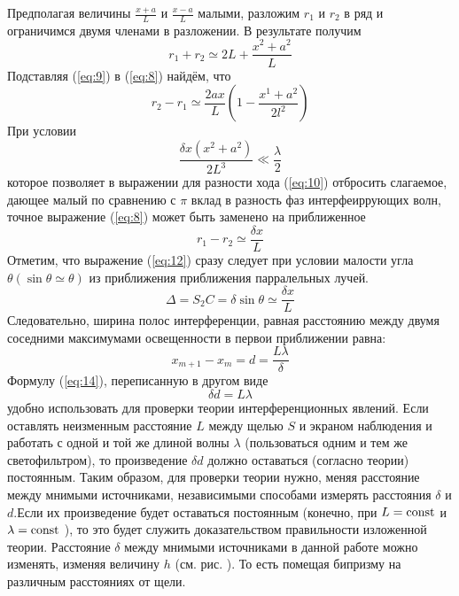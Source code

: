 Предполагая величины $\frac{x+a}{L}$ и $\frac{x-a}{L}$ малыми, разложим $r_1$ и $r_2$ в ряд и ограничимся двумя членами в разложении. В результате получим
\begin{equation}
	\label{eq:9}
	r_1+r_2\simeq 2L +\frac{x^2+a^2}{L} 
\end{equation}
Подставляя (\ref{eq:9}) в (\ref{eq:8}) найдём, что 
\begin{equation}
	r_2-r_1\simeq \frac{2ax}{L}\left(1-\frac{x^1+a^2}{2l^2} \right) \label{eq:10}
\end{equation}
При условии 
\begin{equation}
	\frac{\delta x(x^2+a^2)}{2L^3}\ll\frac{\lambda}{2}
\end{equation}
которое позволяет в выражении для разности хода (\ref{eq:10}) отбросить слагаемое, дающее малый по сравнению с $\pi$ вклад в разность фаз интерфеиррующих волн, точное выражение (\ref{eq:8}) может быть заменено на приближенное
\begin{equation}
 	r_1-r_2\simeq\frac{\delta x}{L} \label{eq:12}
 \end{equation} 
 Отметим, что выражение (\ref{eq:12}) сразу следует при условии малости угла 
 $\theta (\sin{\theta}\simeq\theta)$ из приближения приближения парралельных лучей. 
 \begin{equation}
 	\Delta=S_2C=\delta\sin{\theta}\simeq\frac{\delta x}{L}
 \end{equation}
 Следовательно, ширина полос интерференции, равная расстоянию между двумя соседними максимумами освещенности в первои приближении равна:
 \begin{equation}
 	x_{m+1}-x_m=d=\frac{L\lambda}{\delta} \label{eq:14}
 \end{equation}
 Формулу (\ref{eq:14}), переписанную в другом виде
 \begin{equation}
 	\delta d=L\lambda
 \end{equation}
 удобно использовать для проверки теории интерференционных явлений. Если оставлять неизменным расстояние $L$ между щелью $S$ и экраном наблюдения и работать с одной и той же длиной волны $\lambda$ (пользоваться одним и тем же светофильтром), то произведение $\delta d$ должно оставаться (согласно теории) постоянным. Таким образом, для проверки теории нужно, меняя расстояние между мнимыми источниками, независимыми способами измерять расстояния $\delta$ и $d$.Если их произведение будет оставаться постоянным (конечно, при $L= \text{\rmfamily\upshape const}$ и $\lambda=\text{\rmfamily\upshape const}$ ), то это будет служить доказательством правильности изложенной теории. Расстояние $\delta$ между мнимыми источниками в данной работе можно изменять, изменяя величину $h$ (см. рис. ). То есть помещая бипризму на различным расстояниях от щели.
